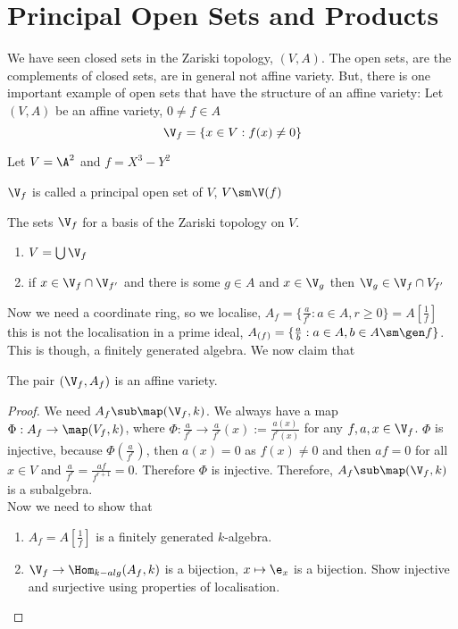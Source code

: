 
\section{Principal Open Sets and Products}
We have seen closed sets in the Zariski topology, $(V, A)$. The open sets, are the complements of closed sets, are in general not affine variety. But, there is one important example of open sets that have the structure of an affine variety: Let $(V, A)$ be an affine variety, $0 \ne f \in A$
$$ \V_f = \{x \in V : f(x) \ne 0\} $$
\begin{eg}
  Let $V = \A^2$ and $f = X^3 - Y^2$
\end{eg}
\begin{ndefi}
  $\V_f$ is called a principal open set of $V$, $V\sm \V(f)$
\end{ndefi}

\begin{exercise}
  The sets $\V_f$ for a basis of the Zariski topology on $V$.
  \begin{enumerate}
    \item $V = \bigcup \V_f$
    \item if $x \in \V_f \cap \V_{f'}$ and there is some $g \in A$ and $x \in \V_g$ then $\V_g \in \V_f \cap V_{f'}$
  \end{enumerate}
\end{exercise}

\noindent
Now we need a coordinate ring, so we localise, $A_f = \{\frac{a}{f^r} : a \in A, r \ge 0\} = A\left[ \frac{1}{f} \right]$ this is not the localisation in a prime ideal, $A_{(f)} = \{\frac{a}{b} : a \in A, b \in A\sm \gen f\}$. This is though, a finitely generated algebra. We now claim that
\begin{claim}
  The pair $(\V_f, A_f)$ is an affine variety.
\end{claim}
\begin{proof}
  We need $A_f \sub \map(\V_f, k)$. We always have a map $\Phi : A_f \to \map(V_f, k)$, where $\Phi : \frac{a}{f^r} \to \frac{a}{f^r}(x) := \frac{a(x)}{f^r(x)}$ for any $f, a, x \in \V_f$. $\Phi$ is injective, because
  $\Phi(\frac{a}{f^r})$, then $a(x) = 0$ as $f(x) \ne 0$ and then $af = 0$ for all $x \in V$ and $\frac{a}{f^r} = \frac{af}{f^{r+1}} = 0$. Therefore $\Phi$ is injective. Therefore, $A_f \sub \map(\V_f, k)$ is a subalgebra.\\

  \noindent
  Now we need to show that
  \begin{enumerate}
    \item $A_f = A\left[ \frac{1}{f} \right]$ is a finitely generated $k$-algebra.
    \item $\V_f \to \Hom_{k-alg}(A_f, k)$ is a bijection, $x \mapsto \e_x$ is a bijection. Show injective and surjective using properties of localisation.
  \end{enumerate}
\end{proof}

